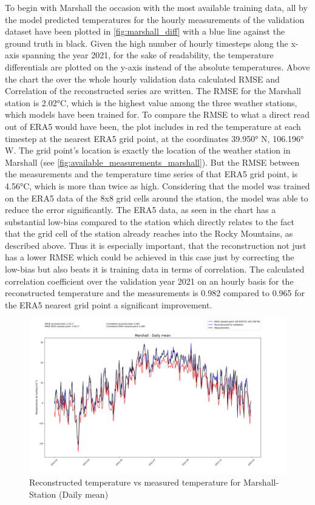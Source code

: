 To begin with Marshall the occasion with the most available training data, all by the model predicted temperatures for the hourly measurements of the validation dataset have been plotted in \autoref{fig:marshall_diff} with a blue line against the ground truth in black. Given the high number of hourly timesteps along the x-axis spanning the year 2021, for the sake of readability, the temperature differentials are plotted on the y-axis instead of the absolute temperatures. Above the chart the over the whole hourly validation data calculated RMSE and Correlation of the reconstructed series are written. The RMSE for the Marshall station is 2.02°C, which is the highest value among the three weather stations, which models have been trained for. To compare the RMSE to what a direct read out of ERA5 would have been, the plot includes in red the temperature at each timestep at the nearest ERA5 grid point, at the coordinates 39.950° N, 106.196° W. The grid point's location is exactly the location of the weather station in Marshall (see \autoref{fig:available_measurements_marshall}). But the RMSE between the measurements and the temperature time series of that ERA5 grid point, is 4.56°C, which is more than twice as high. Considering that the model was trained on the ERA5 data of the 8x8 grid cells around the station, the model was able to reduce the error significantly. The ERA5 data, as seen in the chart has a substantial low-bias compared to the station which directly relates to the fact that the grid cell of the station already reaches into the Rocky Mountains, as described above. Thus it is especially important, that the reconstruction not just has a lower RMSE which could be achieved in this case just by correcting the low-bias but also beats it is training data in terms of correlation. The calculated correlation coefficient over the validation year 2021 on an hourly basis for the reconstructed temperature and the measurements is 0.982 compared to 0.965 for the ERA5 nearest grid point a significant improvement.

\begin{figure}
    \centering
    \includegraphics[width=1.07\textwidth]{resources/images/charts/marshall_eval_grib_final/Marshall - Daily mean.png}
    \caption{Reconstructed temperature vs measured temperature for Marshall-Station (Daily mean)}
    \label{fig:marshall_daily}
\end{figure}

